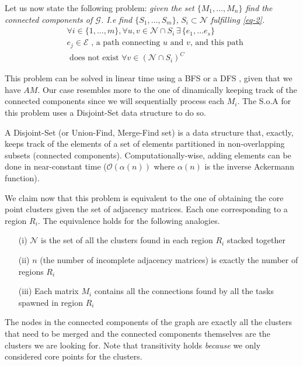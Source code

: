 \documentclass[10pt,journal,compsoc]{IEEEtran}
\begin{document}
Let us now state the following problem: \emph{given the set $\lbrace M_1, \dots, M_n \rbrace$ find the connected components of $\mathcal{G}$. I.e find $\lbrace S_1, \dots, S_m \rbrace, \hspace{2pt}  S_i \subset \mathcal{N}$ fulfilling \ref{eq-2}.}
\begin{equation} \label{eq-2}
\begin{split}
    & \forall i \in \lbrace 1, \dots, m \rbrace, \forall u, v \in \mathcal{N} \cap S_i \hspace{2pt} \exists \hspace{2pt} \lbrace e_1, \dots e_s \rbrace \\ 
    & e_j \in \mathcal{E} \text{ , a path connecting $u$ and $v$, and this path} \\
    & \text{ does not exist } \forall v \in \left( \mathcal{N} \cap S_i \right)^C
\end{split}
\end{equation}

This problem can be solved in linear time using a BFS or a DFS \cite{linear-adj}, given that we have $AM$. Our case resembles more to the one of dinamically keeping track of the connected components since we will sequentially process each $M_i$. The S.o.A for this problem uses a Disjoint-Set data structure to do so.

A Disjoint-Set (or Union-Find, Merge-Find set) is a data structure that, exactly, keeps track of the elements of a set of elements partitioned in non-overlapping subsets (connected components). Computationally-wise, adding elements can be done in near-constant time ($\mathcal{O}(\alpha (n))$ where $\alpha(n)$ is the inverse Ackermann function).

We claim now that this problem is equivalent to the one of obtaining the core point clusters given the set of adjacency matrices. Each one corresponding to a region $R_i$. The equivalence holds for the following analogies.
\begin{itemize}
    \item[(i)] $\mathcal{N}$ is the set of all the clusters found in each region $R_i$ stacked together
    \item[(ii)] $n$ (the number of incomplete adjacency matrices) is exactly the number of regions $R_i$
    \item[(iii)] Each matrix $M_i$ contains all the connections found by all the tasks spawned in region $R_i$
\end{itemize}
The nodes in the connected components of the graph are exactly all the clusters that need to be merged and the connected components themselves are the clusters we are looking for. Note that transitivity holds \emph{because} we only considered core points for the clusters.
\end{document}
